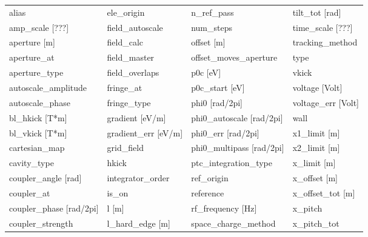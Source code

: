  \begin{tabular}{llll} \toprule
alias                          & ele_origin                     & n_ref_pass                     & tilt_tot [rad]                 \\
amp_scale [???]                & field_autoscale                & num_steps                      & time_scale [???]               \\
aperture [m]                   & field_calc                     & offset [m]                     & tracking_method                \\
aperture_at                    & field_master                   & offset_moves_aperture          & type                           \\
aperture_type                  & field_overlaps                 & p0c [eV]                       & vkick                          \\
autoscale_amplitude            & fringe_at                      & p0c_start [eV]                 & voltage [Volt]                 \\
autoscale_phase                & fringe_type                    & phi0 [rad/2pi]                 & voltage_err [Volt]             \\
bl_hkick [T*m]                 & gradient [eV/m]                & phi0_autoscale [rad/2pi]       & wall                           \\
bl_vkick [T*m]                 & gradient_err [eV/m]            & phi0_err [rad/2pi]             & x1_limit [m]                   \\
cartesian_map                  & grid_field                     & phi0_multipass [rad/2pi]       & x2_limit [m]                   \\
cavity_type                    & hkick                          & ptc_integration_type           & x_limit [m]                    \\
coupler_angle [rad]            & integrator_order               & ref_origin                     & x_offset [m]                   \\
coupler_at                     & is_on                          & reference                      & x_offset_tot [m]               \\
coupler_phase [rad/2pi]        & l [m]                          & rf_frequency [Hz]              & x_pitch                        \\
coupler_strength               & l_hard_edge [m]                & space_charge_method            & x_pitch_tot                    \\

\end{tabular}
